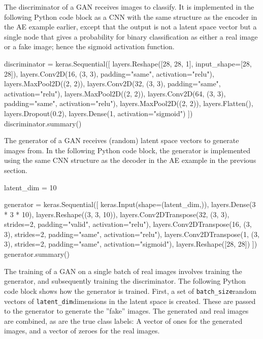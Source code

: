 The discriminator of a GAN receives images to classify. It is implemented in the following Python code block as a CNN with the same structure as the encoder in the AE example earlier, except that the output is not a latent space vector but a single node that gives a probability for binary classification as either a real image or a fake image; hence the sigmoid activation function.

\begin{pythoncode}
discriminator = keras.Sequential([
    layers.Reshape([28, 28, 1], input_shape=[28, 28]),
    layers.Conv2D(16, (3, 3), 
        padding="same", activation="relu"),
    layers.MaxPool2D((2, 2)),
    layers.Conv2D(32, (3, 3), 
        padding="same", activation="relu"),
    layers.MaxPool2D((2, 2)),
    layers.Conv2D(64, (3, 3), 
        padding="same", activation="relu"),
    layers.MaxPool2D((2, 2)),
    layers.Flatten(),
    layers.Dropout(0.2),
    layers.Dense(1, activation="sigmoid")
])
discriminator.summary()
\end{pythoncode}

The generator of a GAN receives (random) latent space vectors to generate images from. In the following Python code block, the generator is implemented using the same CNN structure as the decoder in the AE example in the previous section.

\begin{pythoncode}
latent_dim = 10

generator = keras.Sequential([
    keras.Input(shape=(latent_dim,)),
    layers.Dense(3 * 3 * 10),
    layers.Reshape((3, 3, 10)),
    layers.Conv2DTranspose(32, (3, 3), strides=2, 
        padding="valid", activation="relu"),
    layers.Conv2DTranspose(16, (3, 3), strides=2, 
        padding="same", activation="relu"),
    layers.Conv2DTranspose(1, (3, 3), strides=2, 
        padding="same", activation="sigmoid"),
    layers.Reshape([28, 28])
])
generator.summary()
\end{pythoncode}

The training of a GAN on a single batch of real images involves training the generator, and subsequently training the discriminator. The following Python code block shows how the generator is trained. First, a set of \small\texttt{batch\_size}\normalsize random vectors of \small\texttt{latent\_dim}\normalsize dimensions in the latent space is created. These are passed to the generator to generate the ''fake'' images. The generated and real images are combined, as are the true class labels: A vector of ones for the generated images, and a vector of zeroes for the real images. 

